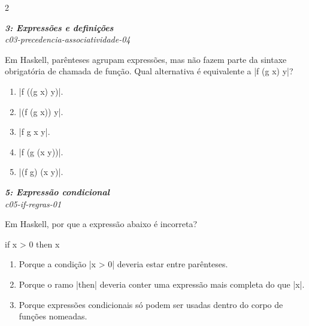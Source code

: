 \documentclass[a4paper,10pt,brazil]{article}
\begin{document}
\begin{multicols}{2}
\begin{enumerate}
\end{enumerate}

\begin{flushright}
  \footnotesize
  \textit{\textbf{3: Expressões e definições}}\\
  \textit{c03-precedencia-associatividade-04}\\

\end{flushright}
Em Haskell, parênteses agrupam expressões, mas não fazem parte da sintaxe obrigatória de chamada de função. Qual alternativa é equivalente a \haskellinline|f (g x) y|?

\begin{enumerate}
  \item \haskellinline|f ((g x) y)|.

  \item \haskellinline|(f (g x)) y|.

  \item \haskellinline|f g x y|.

  \item \haskellinline|f (g (x y))|.

  \item \haskellinline|(f g) (x y)|.


\end{enumerate}

\begin{flushright}
  \footnotesize
  \textit{\textbf{5: Expressão condicional}}\\
  \textit{c05-if-regras-01}\\

\end{flushright}
Em Haskell, por que a expressão abaixo é incorreta?
\begin{haskellcode}
if x > 0 then x
\end{haskellcode}

\begin{enumerate}
  \item Porque a condição \haskellinline|x > 0| deveria estar entre parênteses.

  \item Porque o ramo \haskellinline|then| deveria conter uma expressão mais completa do que \haskellinline|x|.

  \item Porque expressões condicionais só podem ser usadas dentro do corpo de funções nomeadas.


\end{enumerate}
\end{multicols}
\end{document}
